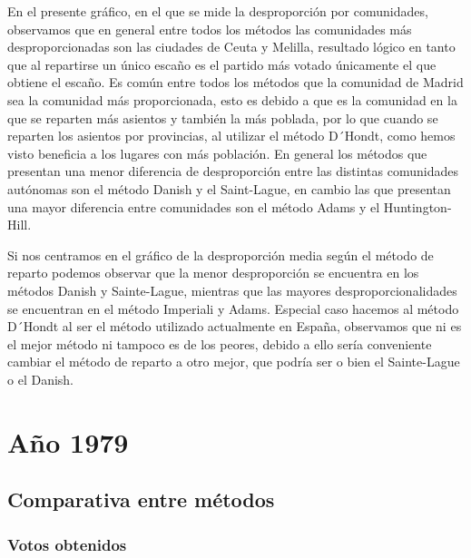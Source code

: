 \documentclass[12pt,a4paper,]{book}
\numberwithin{dummy}{section}
\theoremstyle{ocrenumbox}
\theoremstyle{blacknumex}
\theoremstyle{blacknumbox}
\theoremstyle{ocrenum}
\theoremstyle{ocrenum}
\begin{document}
En el presente gráfico, en el que se mide la desproporción por
comunidades, observamos que en general entre todos los métodos las
comunidades más desproporcionadas son las ciudades de Ceuta y Melilla,
resultado lógico en tanto que al repartirse un único escaño es el
partido más votado únicamente el que obtiene el escaño. Es común entre
todos los métodos que la comunidad de Madrid sea la comunidad más
proporcionada, esto es debido a que es la comunidad en la que se
reparten más asientos y también la más poblada, por lo que cuando se
reparten los asientos por provincias, al utilizar el método D´Hondt,
como hemos visto beneficia a los lugares con más población. En general
los métodos que presentan una menor diferencia de desproporción entre
las distintas comunidades autónomas son el método Danish y el
Saint-Lague, en cambio las que presentan una mayor diferencia entre
comunidades son el método Adams y el Huntington-Hill.

Si nos centramos en el gráfico de la desproporción media según el método
de reparto podemos observar que la menor desproporción se encuentra en
los métodos Danish y Sainte-Lague, mientras que las mayores
desproporcionalidades se encuentran en el método Imperiali y Adams.
Especial caso hacemos al método D´Hondt al ser el método utilizado
actualmente en España, observamos que ni es el mejor método ni tampoco
es de los peores, debido a ello sería conveniente cambiar el método de
reparto a otro mejor, que podría ser o bien el Sainte-Lague o el Danish.

\hypertarget{auxf1o-1979}{%
\section{Año 1979}\label{auxf1o-1979}}

\hypertarget{comparativa-entre-muxe9todos-1}{%
\subsection{Comparativa entre
métodos}\label{comparativa-entre-muxe9todos-1}}

\hypertarget{votos-obtenidos-1}{%
\subsubsection{Votos obtenidos}\label{votos-obtenidos-1}}
\end{document}
